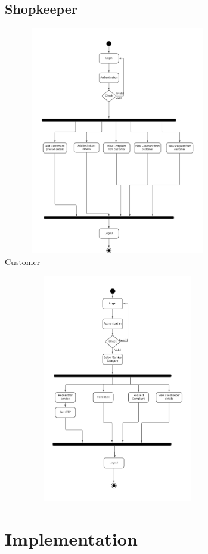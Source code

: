\documentclass[conference]{IEEEtran}
\begin{document}
\subsection{Shopkeeper}
\graphicspath{ {./shopkeeper/} }
\includegraphics[width=10cm , height=10cm]{shopkeeper}
\\Customer
\graphicspath{ {./customer/} }
\includegraphics[width=10cm , height=10cm]{customer}



\section{Implementation}
\end{document}
